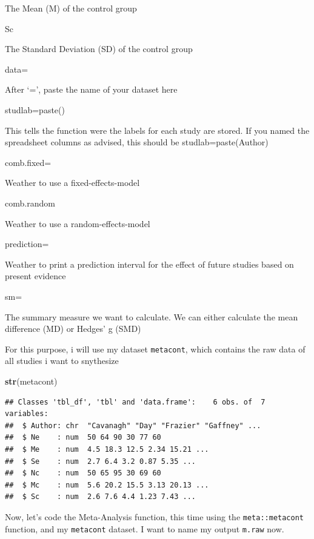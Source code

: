 \documentclass[]{book}
\newenvironment{Shaded}{\begin{snugshade}}{\end{snugshade}}
\newcommand{\KeywordTok}[1]{\textcolor[rgb]{0.13,0.29,0.53}{\textbf{#1}}}
\newcommand{\NormalTok}[1]{#1}
\begin{document}
The Mean (M) of the control group

Sc

The Standard Deviation (SD) of the control group

data=

After `=', paste the name of your dataset here

studlab=paste()

This tells the function were the labels for each study are stored. If you named the spreadsheet columns as advised, this should be studlab=paste(Author)

comb.fixed=

Weather to use a fixed-effects-model

comb.random

Weather to use a random-effects-model

prediction=

Weather to print a prediction interval for the effect of future studies based on present evidence

sm=

The summary measure we want to calculate. We can either calculate the mean difference (MD) or Hedges' g (SMD)

For this purpose, i will use my dataset \texttt{metacont}, which contains the raw data of all studies i want to snythesize

\begin{Shaded}
\begin{Highlighting}[]
\KeywordTok{str}\NormalTok{(metacont)}
\end{Highlighting}
\end{Shaded}

\begin{verbatim}
## Classes 'tbl_df', 'tbl' and 'data.frame':    6 obs. of  7 variables:
##  $ Author: chr  "Cavanagh" "Day" "Frazier" "Gaffney" ...
##  $ Ne    : num  50 64 90 30 77 60
##  $ Me    : num  4.5 18.3 12.5 2.34 15.21 ...
##  $ Se    : num  2.7 6.4 3.2 0.87 5.35 ...
##  $ Nc    : num  50 65 95 30 69 60
##  $ Mc    : num  5.6 20.2 15.5 3.13 20.13 ...
##  $ Sc    : num  2.6 7.6 4.4 1.23 7.43 ...
\end{verbatim}

Now, let's code the Meta-Analysis function, this time using the \texttt{meta::metacont} function, and my \texttt{metacont} dataset. I want to name my output \texttt{m.raw} now.
\end{document}
